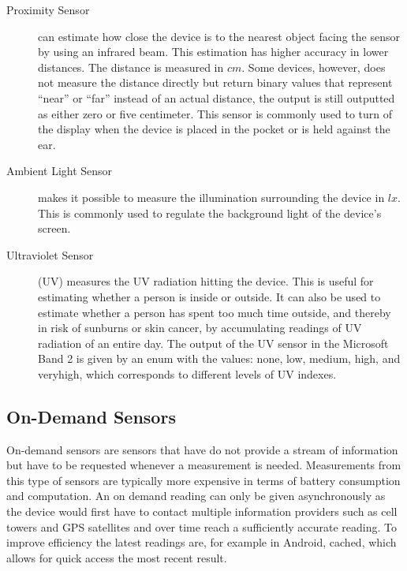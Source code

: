 \begin{description}
    \item[Proximity Sensor] can estimate how close the device is to the nearest object facing the sensor by using an infrared beam. This estimation has higher accuracy in lower distances. The distance is measured in $cm$. Some devices, however, does not measure the distance directly but return binary values that represent ``near'' or ``far'' instead of an actual distance, the output is still outputted as either zero or five centimeter. This sensor is commonly used to turn of the display when the device is placed in the pocket or is held against the ear.
    \item[Ambient Light Sensor] makes it possible to measure the illumination surrounding the device in $lx$. This is commonly used to regulate the background light of the device's screen.
    \item[Ultraviolet Sensor] (UV) measures the UV radiation hitting the device. This is useful for estimating whether a person is inside or outside. It can also be used to estimate whether a person has spent too much time outside, and thereby in risk of sunburns or skin cancer, by accumulating readings of UV radiation of an entire day. The output of the UV sensor in the Microsoft Band 2 is given by an enum with the values: none, low, medium, high, and veryhigh, which corresponds to different levels of UV indexes. 
\end{description}

\subsection{On-Demand Sensors}
On-demand sensors are sensors that have do not provide a stream of information but have to be requested whenever a measurement is needed. Measurements from this type of sensors are typically more expensive in terms of battery consumption and computation. An on demand reading can only be given asynchronously as the device would first have to contact multiple information providers such as cell towers and GPS satellites and over time reach a sufficiently accurate reading. To improve efficiency the latest readings are, for example in Android, cached, which allows for quick access the most recent result.

